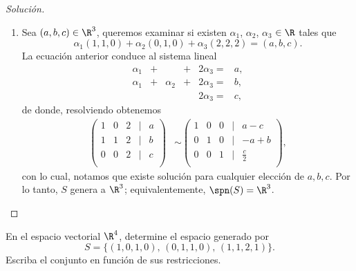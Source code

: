 \documentclass[a4,11pt]{aleph-notas}
\begin{document}
\begin{proof}[Solución]
\begin{enumerate}
        \item Sea $(a, b, c) \in \R^3$, queremos examinar si existen $\alpha_1$, $\alpha_2$, $\alpha_3$  $\in \R$ tales que  
        \[
        \alpha_{1} (1, 1, 0) + \alpha_{2} (0, 1, 0) + \alpha_{3} (2, 2, 2) =(a, b, c).
        \]
        La ecuación anterior conduce al sistema lineal
        \[
        \begin{array}{rrrrrrr}
         \alpha _{1} & + & & + & 2\alpha_{3} = & a, \\
         \alpha _{1} & + &\alpha_{2}& + &2\alpha_{3}= & b,\\
         & & & &2\alpha_{3}= & c,
         \end{array}
         \]
         de donde, resolviendo obtenemos
        \begin{align*}
        \begin{pmatrix}
            1&0&2&|&a\\
            1&1&2&|&b\\
            0&0&2&|&c\\
        \end{pmatrix}
        & \sim 
        \begin{pmatrix}
            1&0&0&|&a-c\\
            0&1&0&|&-a+b\\
            0&0&1&|&\frac{c}{2}\\
        \end{pmatrix},
        \end{align*}
        con lo cual, notamos que existe solución para cualquier elección de $a, b, c$. Por lo tanto, $S$ genera a $\R^3$; equivalentemente, $\spn(S)=\R^3$. \qedhere
    \end{enumerate}
\end{proof}

\begin{ejer}
    En el espacio vectorial $\R^4$, determine el espacio generado por
    \[
        S=\{(1,0,1,0),\,(0,1,1,0),\,(1,1,2,1)\}.
    \]
    Escriba el conjunto en función de sus restricciones.
\end{ejer}
\end{document}
